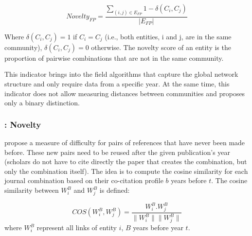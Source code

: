\begin{figure}[h!]
  \centering
  
  \caption[\cite{foster2015tradition}]{\cite{foster2015tradition} \footnotemark}
\end{figure} 


$$Novelty_{FP} = \frac{\sum\limits_{(i, j) \in E_{FP}} 1-\delta(C_i,C_j)}{|E_{FP}|} $$


Where $\delta(C_i, C_j) = 1$ if $C_i = C_j$ (i.e., both entities, i and j, are in the same community), $\delta(C_i, C_j) = 0$ otherwise. The novelty score of an entity is the proportion of pairwise combinations that are not in the same community.

This indicator brings into the field algorithms that capture the global network structure and only require data from a specific year. At the same time, this indicator does not allow measuring distances between communities and proposes only a binary distinction.

\subsubsection{\cite{wang2017bias}: Novelty}


\cite{wang2017bias} propose a measure of difficulty for pairs of references that have never been made before. These new pairs need to be reused after the given publication's year (scholars do not have to cite directly the paper that creates the combination, but only the combination itself). The idea is to compute the cosine similarity for each journal combination based on their co-citation profile $b$ years before $t$. The cosine similarity between $W^B_i$ and $W^B_j$ is defined:

$$COS(W^B_i,W^B_j) = \frac{W^B_i.W^B_j}{\|W^B_i\| \|W^B_j\|}$$
where $W^B_i$ represent all links of entity $i$, $B$ years before year $t$.

